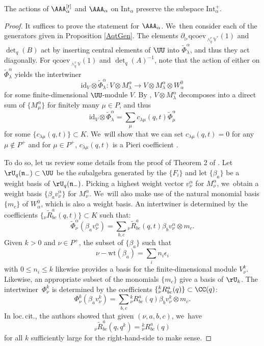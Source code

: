 \begin{lem}
The actions of $\AAA_\alpha^{[t]}$ and $\AAA_\alpha$ on $\mathrm{Int}_\alpha$ preserve the subspace $\mathrm{Int}_\alpha^+$.
\end{lem}

\begin{proof}
It suffices to prove the statement for $\AAA_\alpha$. We~then consider each of the generators given in Proposition \ref{AqtGen}.
The elements $\partial_\triangleright\mathrm{qcoev}_{\wedge_q^r\mathbb{V}^*}(1)$ and $\det_q(B)$ act by inserting central elements of $\UU$ into $\widetilde{\Phi}_\lambda^\alpha$, and thus they act diagonally.
For $\mathrm{qcoev}_{\wedge^r_q\mathbb{V}}(1)$ and $\det_q(A)^{-1}$, note that the action of either on $\widetilde{\Phi}_\lambda^\alpha$ yields the intertwiner
\[
\mathrm{id}_V\otimes\widetilde{\Phi}_\lambda^\alpha: V\otimes M_\lambda^\alpha\to V\otimes M_\lambda^\alpha\otimes W_\alpha^0
\]
for some finite-dimensional $\UU$-module $V$.
By \cite[Lem.\,5]{BGGHWt}, $V\otimes M_\lambda^\alpha$ decomposes into a direct sum of $\{M_\mu^\alpha\}$ for finitely many $\mu\in P$, and thus
\[
\mathrm{id}_V\otimes\widetilde{\Phi}_\lambda^\alpha=\sum_{\mu}c_{\lambda\mu}(q,t)\widetilde{\Phi}_\mu^\alpha
\]
for some $\{c_{\lambda\mu}(q,t)\}\subset K$. We~will show that we can set $c_{\lambda\mu}(q,t)=0$ for any $\mu\not\in P^+$ and for $\mu\in P^+$, $c_{\lambda\mu}(q,t)$ is a Pieri coefficient \cite[VI.6]{MacBook}.

To do so, let us review some details from the proof of Theorem 2 of \cite{EtKirQuant}.
Let $\rU_q(\mathfrak{n}_-)\subset\UU$ be the subalgebra generated by the $\{F_i\}$ and let $\{\beta_a\}$ be a weight basis of $\rU_q(\mathfrak{n}_-)$.
Picking a highest weight vector $v_\nu^\alpha$ for $M_\nu^\alpha$, we~obtain a weight basis $\{\beta_a v_\nu^\alpha\}$ for $M_\nu^\alpha$. We~will also make use of the natural monomial basis $\{m_c\}$ of $W_\alpha^0$, which is also a weight basis.
An intertwiner is determined by the coefficients $\{ {}_\nu\widetilde{R}_{bc}^a(q,t)\}\subset K$ such that:
\[
\widetilde{\Phi}_\nu^\alpha(\beta_a v_\nu^\alpha)=\sum_{b,c}{}_\nu\widetilde{R}_{bc}^a(q,t)\beta_b v_\nu^\alpha\otimes m_c.
\]
Given $k>0$ and $\nu\in P^+$, the subset of $\{\beta_a\}$ such that
\[
\nu-\mathrm{wt}(\beta_a)=\sum_{i}n_i\epsilon_i
\]
with $0\le n_i\le k$ likewise provides a basis for the finite-dimensional module $V_\nu^k$.
Likewise, an appropriate subset of the monomials $\{m_c\}$ give a basis of $\rU_k$.
The intertwiner~$\Phi_\nu^k$ is determined by the coefficients $\{ {}_\nu^kR_{bc}^a(q)\}\subset\CC(q)$:
\[
\Phi_\nu^k(\beta_a v_\nu^k)=\sum_{b,c}{}_\nu^k R_{bc}^a(q)\beta_b v_\nu^k\otimes m_c.
\]
In loc.\,cit., the authors showed that given $(\nu, a, b, c)$, we~have
\[
{}_\nu\widetilde{R}_{bc}^a(q,q^k)= {}_\nu^kR_{bc}^a(q)
\]
for all $k$ sufficiently large for the right-hand-side to make sense.


\end{proof}
